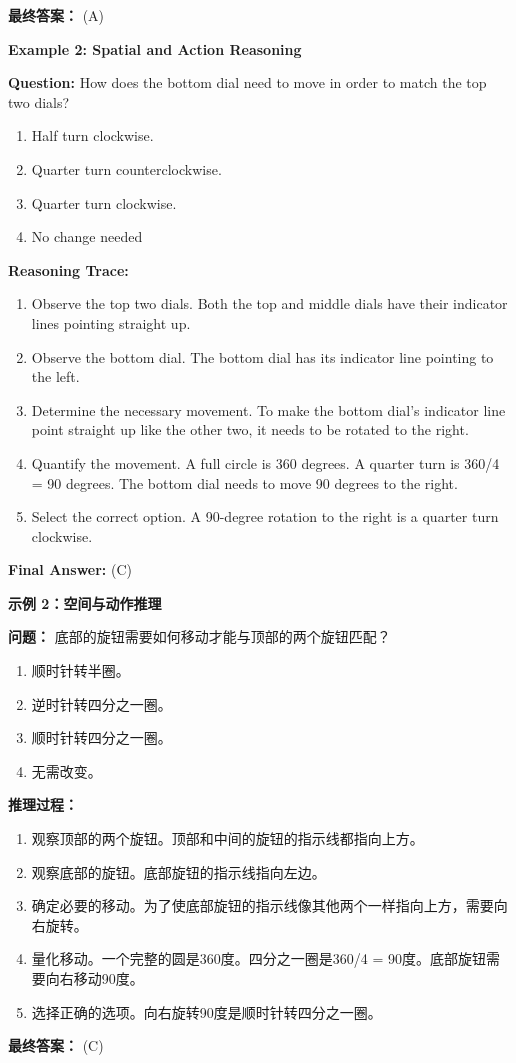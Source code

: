 \documentclass[12pt,a4paper]{article}
\begin{document}
\begin{itemize}
    \textbf{最终答案：} (A)

    \textbf{Example 2: Spatial and Action Reasoning}

    \textbf{Question:} How does the bottom dial need to move in order to match the top two dials?
    \begin{enumerate}[label=\Alph*.]
        \item Half turn clockwise.
        \item Quarter turn counterclockwise.
        \item Quarter turn clockwise.
        \item No change needed
    \end{enumerate}

    \textbf{Reasoning Trace:}
    \begin{enumerate}
        \item Observe the top two dials. Both the top and middle dials have their indicator lines pointing straight up.
        \item Observe the bottom dial. The bottom dial has its indicator line pointing to the left.
        \item Determine the necessary movement. To make the bottom dial's indicator line point straight up like the other two, it needs to be rotated to the right.
        \item Quantify the movement. A full circle is 360 degrees. A quarter turn is 360/4 = 90 degrees. The bottom dial needs to move 90 degrees to the right.
        \item Select the correct option. A 90-degree rotation to the right is a quarter turn clockwise.
    \end{enumerate}

    \textbf{Final Answer:} (C)

    \textbf{示例 2：空间与动作推理}

    \textbf{问题：} 底部的旋钮需要如何移动才能与顶部的两个旋钮匹配？
    \begin{enumerate}[label=\Alph*.]
        \item 顺时针转半圈。
        \item 逆时针转四分之一圈。
        \item 顺时针转四分之一圈。
        \item 无需改变。
    \end{enumerate}

    \textbf{推理过程：}
    \begin{enumerate}
        \item 观察顶部的两个旋钮。顶部和中间的旋钮的指示线都指向上方。
        \item 观察底部的旋钮。底部旋钮的指示线指向左边。
        \item 确定必要的移动。为了使底部旋钮的指示线像其他两个一样指向上方，需要向右旋转。
        \item 量化移动。一个完整的圆是360度。四分之一圈是360/4 = 90度。底部旋钮需要向右移动90度。
        \item 选择正确的选项。向右旋转90度是顺时针转四分之一圈。
    \end{enumerate}

    \textbf{最终答案：} (C)
\end{itemize}
\end{document}
